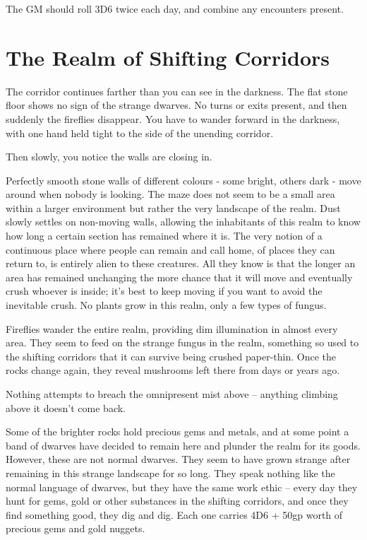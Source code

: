 The GM should roll 3D6 twice each day, and combine any encounters present.

\section{The Realm of Shifting Corridors}

\begin{boxtext}
	The corridor continues farther than you can see in the darkness.  The flat stone floor shows no sign of the strange dwarves.  No turns or exits present, and then suddenly the fireflies disappear.  You have to wander forward in the darkness, with one hand held tight to the side of the unending corridor.

	Then slowly, you notice the walls are closing in.

\end{boxtext}

Perfectly smooth stone walls of different colours - some bright, others dark - move around when nobody is looking.  The maze does not seem to be a small area within a larger environment but rather the very landscape of the realm.  Dust slowly settles on non-moving walls, allowing the inhabitants of this realm to know how long a certain section has remained where it is.  The very notion of a continuous place where people can remain and call home, of places they can return to, is entirely alien to these creatures.  All they know is that the longer an area has remained unchanging the more chance that it will move and eventually crush whoever is inside; it's best to keep moving if you want to avoid the inevitable crush.  No plants grow in this realm, only a few types of fungus.

Fireflies wander the entire realm, providing dim illumination in almost every area.  They seem to feed on the strange fungus in the realm, something so used to the shifting corridors that it can survive being crushed paper-thin.  Once the rocks change again, they reveal mushrooms left there from days or years ago.

Nothing attempts to breach the omnipresent mist above -- anything climbing above it doesn't come back.

Some of the brighter rocks hold precious gems and metals, and at some point a band of dwarves have decided to remain here and plunder the realm for its goods.  However, these are not normal dwarves.  They seem to have grown strange after remaining in this strange landscape for so long.  They speak nothing like the normal language of dwarves, but they have the same work ethic -- every day they hunt for gems, gold or other substances in the shifting corridors, and once they find something good, they dig and dig.  Each one carries 4D6 + 50gp worth of precious gems and gold nuggets.

